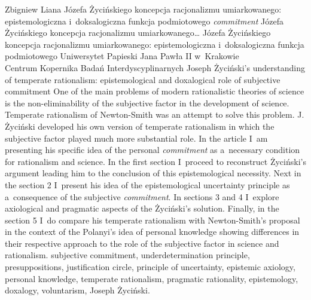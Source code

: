 \begin{artplenv}{Zbigniew Liana}
	{Józefa Życińskiego koncepcja racjonalizmu umiarkowanego: epistemologiczna i~doksalogiczna funkcja podmiotowego \textit{commitment}}
	{Józefa Życińskiego koncepcja racjonalizmu umiarkowanego\ldots}
	{Józefa Życińskiego koncepcja racjonalizmu umiarkowanego: epistemologiczna i~doksalogiczna funkcja podmiotowego }
	{Uniwersytet Papieski Jana Pawła II w~Krakowie\\	
	Centrum Kopernika Badań Interdyscyplinarnych\label{liana-anfang}}
	{Joseph Życiński's understanding of temperate rationalism: epistemological and doxalogical role of subjective commitment}
	{One of the main problems of modern rationalistic theories of science is the non-eliminability of the subjective factor in the development of science. Temperate rationalism of Newton-Smith was an attempt to solve this problem. J. Życiński developed his own version of temperate rationalism in which the subjective factor played much more substantial role. In the article I~am presenting his specific idea of the personal \textit{commitment} as a~necessary condition for rationalism and science. In the first section I~proceed to reconstruct Życiński's argument leading him to the conclusion of this epistemological necessity. Next in the section 2 I~present his idea of the epistemological uncertainty principle as a~consequence of the subjective \textit{commitment}. In sections 3 and 4 I~explore axiological and pragmatic aspects of the Życiński's solution. Finally, in the section 5 I~do compare his temperate rationalism with Newton-Smith's proposal in the context of the Polanyi's idea of personal knowledge showing differences in their respective approach to the role of the subjective factor in science and rationalism.}
	{subjective commitment, underdetermination principle, presuppositions, justification circle, principle of uncertainty, epistemic axiology, personal knowledge, temperate rationalism, pragmatic rationality, epistemology, doxalogy, voluntarism, Joseph Życiński.}



\end{artplenv}
